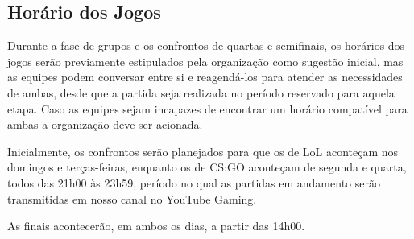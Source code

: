 \subsection{Horário dos Jogos}

Durante a fase de grupos e os confrontos de quartas e semifinais, os horários dos jogos serão previamente estipulados pela organização como sugestão inicial, mas as equipes podem conversar entre si e reagendá-los para atender as necessidades de ambas, desde que a partida seja realizada no período reservado para aquela etapa. Caso as equipes sejam incapazes de encontrar um horário compatível para ambas a organização deve ser acionada.

Inicialmente, os confrontos serão planejados para que os de LoL aconteçam nos domingos e terças-feiras, enquanto os de CS:GO aconteçam de segunda e quarta, todos das 21h00 às 23h59, período no qual as partidas em andamento serão transmitidas em nosso canal no YouTube Gaming.

As finais acontecerão, em ambos os dias, a partir das 14h00.
